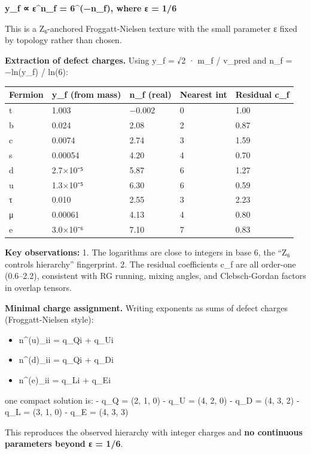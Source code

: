 \documentclass[11pt,a4paper]{article}
\theoremstyle{remark}
\providecommand{\tightlist}{%
  \setlength{\itemsep}{0pt}\setlength{\parskip}{0pt}}
\begin{document}
\textbf{y\_f ∝ ε\^{}n\_f = 6\^{}(−n\_f), where ε = 1/6}

This is a Z₆-anchored Froggatt-Nielsen texture with the small parameter ε fixed by topology rather than chosen.

\textbf{Extraction of defect charges.} Using y\_f = √2 · m\_f / v\_pred and n\_f = −ln(y\_f) / ln(6):

{\def\LTcaptype{none} %
\begin{longtable}[]{@{}lllll@{}}
\toprule\noalign{}
Fermion & y\_f (from mass) & n\_f (real) & Nearest int & Residual c\_f \\
\midrule\noalign{}
\endhead
\bottomrule\noalign{}
\endlastfoot
t & 1.003 & −0.002 & 0 & 1.00 \\
b & 0.024 & 2.08 & 2 & 0.87 \\
c & 0.0074 & 2.74 & 3 & 1.59 \\
s & 0.00054 & 4.20 & 4 & 0.70 \\
d & 2.7×10⁻⁵ & 5.87 & 6 & 1.27 \\
u & 1.3×10⁻⁵ & 6.30 & 6 & 0.59 \\
τ & 0.010 & 2.55 & 3 & 2.23 \\
μ & 0.00061 & 4.13 & 4 & 0.80 \\
e & 3.0×10⁻⁶ & 7.10 & 7 & 0.83 \\
\end{longtable}
}

\textbf{Key observations:}
1. The logarithms are close to integers in base 6, the ``Z₆ controls hierarchy''
fingerprint.
2. The residual coefficients c\_f are all order-one (0.6--2.2), consistent with
RG running, mixing angles, and Clebsch-Gordan factors in overlap tensors.

\textbf{Minimal charge assignment.} Writing exponents as sums of defect charges (Froggatt-Nielsen style):

\begin{itemize}
\tightlist
\item
  n\^{}(u)\_ii = q\_Qi + q\_Ui
\item
  n\^{}(d)\_ii = q\_Qi + q\_Di
\item
  n\^{}(e)\_ii = q\_Li + q\_Ei
\end{itemize}

one compact solution is:
- q\_Q = (2, 1, 0)
- q\_U = (4, 2, 0)
- q\_D = (4, 3, 2)
- q\_L = (3, 1, 0)
- q\_E = (4, 3, 3)

This reproduces the observed hierarchy with integer charges and \textbf{no continuous
parameters beyond ε = 1/6}.
\end{document}
